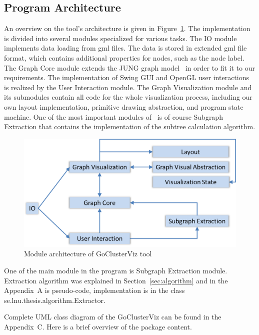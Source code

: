 \subsection{Program Architecture}

An overview on the tool's architecture is given in Figure~\ref{fig:modules}. The implementation is divided into several modules specialized for various tasks.
The \textsf{IO} module implements data loading from gml files. The data is stored in extended gml file format,
which contains additional properties for nodes, such as the node label.
The \textsf{Graph Core} module extends the JUNG graph model~\cite{JUNG} in order to fit it to our requirements.
The implementation of Swing GUI and OpenGL user interactions is realized by the \textsf{User Interaction} module.
The \textsf{Graph Visualization} module and its submodules contain all code for the whole visualization process,
including our own layout implementation, primitive drawing abstraction, and program state machine.
One of the most important modules of \tool\ is of course \textsf{Subgraph Extraction} that contains the implementation of the subtree calculation algorithm.

\begin{figure}[h!]
\centering
\includegraphics[scale=0.6]{pictures/modules.png}
\caption{Module architecture of GoClusterViz tool}
\label{fig:modules}
\end{figure}

One of the main module in the program is \textsf{Subgraph Extraction} module. Extraction algorithm was explained in Section~\ref{sec:algorithm} and in the Appendix~A is pseudo-code, implementation is in the class \textsf{se.lnu.thesis.algorithm.Extractor}.

Complete UML class diagram of the GoClusterViz can be found in the Appendix~C. Here is a brief overview of the package content.

